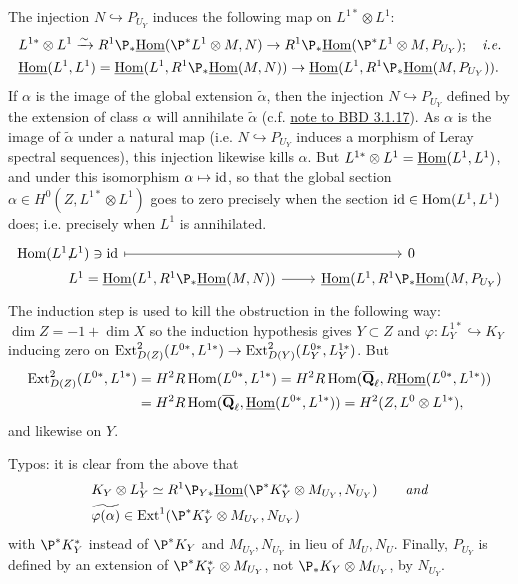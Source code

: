 \documentclass[deligne.tex]{subfiles}
\begin{document}
The injection $N\hookrightarrow P_{U_Y}$ induces the following map on
$L^{1*}\otimes L^1$:
\begin{align*}
	&L^{1*}\otimes L^1\xra\sim R^1\P_*\underline\Hom(\P^*L^1\otimes M,N)
	\ra R^1\P_*\underline\Hom(\P^*L^1\otimes M,P_{U_Y});\quad\text{\emph{i.e.}} \\
	&\underline\Hom(L^1,L^1)=
	\underline\Hom(L^1, R^1\P_*\underline\Hom(M,N))
	\ra\underline\Hom(L^1, R^1\P_*\underline\Hom(M,P_{U_Y})).
\end{align*}
If $\alpha$ is the image of the global extension $\tilde\alpha$,
then the injection $N\hookrightarrow P_{U_Y}$ defined by the extension of
class $\alpha$ will annihilate $\tilde\alpha$ (c.f.
\hyperref[sec:killExts]{note to BBD 3.1.17}). As $\alpha$ is the image of
$\tilde\alpha$ under a natural map (i.e. $N\hookrightarrow P_{U_Y}$ induces
a morphism of Leray spectral sequences), this injection likewise kills
$\alpha$. But $L^{1*}\otimes L^1=\underline{\operatorname{Hom}}(L^1,L^1)$, and under
this isomorphism $\alpha\mapsto\operatorname{id}$, so that the global section
$\alpha\in H^0(Z,L^{1*}\otimes L^1)$ goes to zero precisely when the section
$\operatorname{id}\in\operatorname{Hom}(L^1,L^1)$ does; i.e. precisely when $L^1$ is
annihilated.
\begin{equation*}\begin{tikzcd} [%
    ,row sep = 0ex
    ,/tikz/column 1/.append style={anchor=base east}
    ,/tikz/column 2/.append style={anchor=base west}
    ]
	\Hom(L^1,&[-35pt]L^1)\ni\id\arrow[r,mapsto]&0 \\
	&L^1=\underline\Hom(L^1, R^1\P_*\underline\Hom(M,N))\arrow[r]
	&\underline\Hom(L^1, R^1\P_*\underline\Hom(M,P_{U_Y})
\end{tikzcd}\end{equation*}
The induction step is used to kill the obstruction in the following way:
$\dim Z=-1+\dim X$ so the induction hypothesis gives $Y\subset Z$ and
$\varphi:L^{1*}_Y\hookrightarrow K_Y$ inducing zero on
$\operatorname{Ext}^2_{D(Z)}(L^{0*},L^{1*})\rightarrow\operatorname{Ext}^2_{D(Y)}(L^{0*}_Y,L^{1*}_Y)$. But
\begin{align*}
	\operatorname{Ext}^2_{D(Z)}(L^{0*},L^{1*})
	&=H^2R\operatorname{Hom}(L^{0*},L^{1*})
	=H^2R\operatorname{Hom}(\overline{\mathbf{Q}}_\ell,R\underline{\operatorname{Hom}}(L^{0*},L^{1*})) \\
	&=H^2R\operatorname{Hom}(\overline{\mathbf{Q}}_\ell,\underline{\operatorname{Hom}}(L^{0*},L^{1*}))
	=H^2(Z,L^{0}\otimes L^{1*}),
\end{align*}
and likewise on $Y$.

Typos: it is clear from the above that
\begin{align*}
	&K_Y\otimes L^1_Y\simeq R^1\P_{Y*}\underline\Hom(\P^*K_Y^*\otimes M_{U_Y},N_{U_Y})
	\qquad\text{\emph{and}} \\
	&\widetilde{\varphi(\alpha)}\in\Ext^1(\P^*K_Y^*\otimes M_{U_Y},N_{U_Y})
\end{align*}
with $\P^*K_Y^*$ instead of $\P^*K_Y$ and $M_{U_Y},N_{U_Y}$ in lieu of
$M_U,N_U$. Finally, $P_{U_Y}$ is defined by an extension of
$\P^*K_Y^*\otimes M_{U_Y}$, not $\P_*K_Y\otimes M_{U_Y}$, by $N_{U_Y}$.
\end{document}
